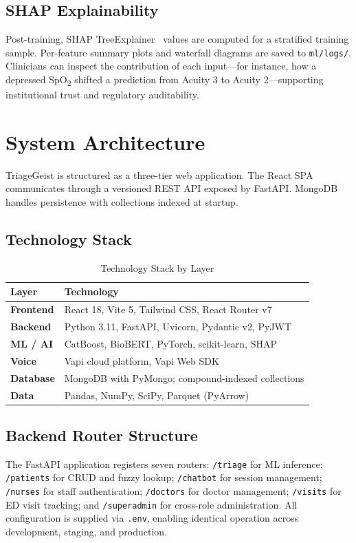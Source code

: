 \documentclass[conference]{IEEEtran}
\begin{document}
\subsection{SHAP Explainability}
Post-training, SHAP TreeExplainer~\cite{lundberg2017} values are computed for a stratified training sample. Per-feature summary plots and waterfall diagrams are saved to \texttt{ml/logs/}. Clinicians can inspect the contribution of each input---for instance, how a depressed SpO\textsubscript{2} shifted a prediction from Acuity 3 to Acuity 2---supporting institutional trust and regulatory auditability.

\section{System Architecture}

TriageGeist is structured as a three-tier web application. The React SPA communicates through a versioned REST API exposed by FastAPI. MongoDB handles persistence with collections indexed at startup.

\subsection{Technology Stack}

\begin{table}[t]
\caption{Technology Stack by Layer}
\label{tab:stack}
\renewcommand{\arraystretch}{1.2}
\begin{tabularx}{\columnwidth}{>{\bfseries}lX}
\toprule
Layer & Technology \\
\midrule
Frontend & React 18, Vite 5, Tailwind CSS, React Router v7 \\
Backend & Python 3.11, FastAPI, Uvicorn, Pydantic v2, PyJWT \\
ML / AI & CatBoost, BioBERT, PyTorch, scikit-learn, SHAP \\
Voice & Vapi cloud platform, Vapi Web SDK \\
Database & MongoDB with PyMongo; compound-indexed collections \\
Data & Pandas, NumPy, SciPy, Parquet (PyArrow) \\
\bottomrule
\end{tabularx}
\end{table}

\subsection{Backend Router Structure}
The FastAPI application registers seven routers: \texttt{/triage} for ML inference; \texttt{/patients} for CRUD and fuzzy lookup; \texttt{/chatbot} for session management; \texttt{/nurses} for staff authentication; \texttt{/doctors} for doctor management; \texttt{/visits} for ED visit tracking; and \texttt{/superadmin} for cross-role administration. All configuration is supplied via \texttt{.env}, enabling identical operation across development, staging, and production.
\end{document}
